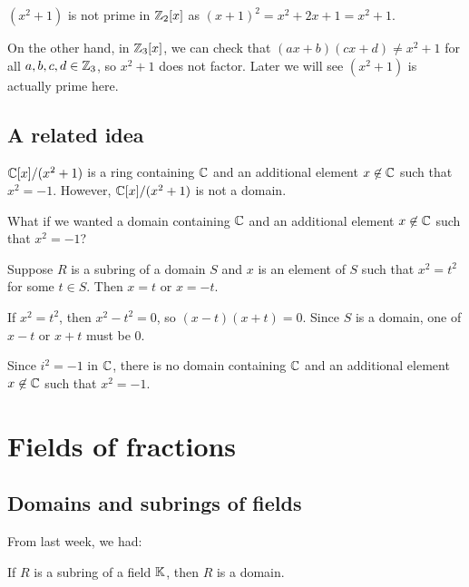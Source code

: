 \documentclass[12pt,letterpaper]{report}
\begin{document}
\begin{ex}
  $(x^2 + 1)$ is not prime in $\mathbb{Z}_2[x]$ as $(x + 1)^2 = x^2 + 2x + 1 = x^2 + 1$.

  On the other hand, in $\mathbb{Z}_3[x]$, we can check that $(ax + b)(cx + d) \neq x^2 + 1$ for all
  $a, b, c, d \in \mathbb{Z}_3$, so $x^2 + 1$ does not factor.
  Later we will see $(x^2 + 1)$ is actually prime here.
\end{ex}

\pagebreak
\subsection{A related idea}

$\mathbb{C}[x]/(x^2 + 1)$ is a ring containing $\mathbb{C}$ and an additional element $x \not\in \mathbb{C}$ such that
$x^2 = -1$.
However, $\mathbb{C}[x]/(x^2 + 1)$ is not a domain.

What if we wanted a domain containing $\mathbb{C}$ and an additional element $x \not\in \mathbb{C}$ such that
$x^2 = -1$?

\begin{prop}{}{}
  Suppose $R$ is a subring of a domain $S$ and $x$ is an element of $S$ such that $x^2 = t^2$ for
  some $t \in S$.
  Then $x = t$ or $x = -t$.
\end{prop}

\begin{thmproof}
  If $x^2 = t^2$, then $x^2 - t^2 = 0$, so $(x - t)(x + t) = 0$.
  Since $S$ is a domain, one of $x - t$ or $x + t$ must be 0.
\end{thmproof}

Since $i^2 = -1$ in $\mathbb{C}$, there is no domain containing $\mathbb{C}$ and an additional element
$x \not\in \mathbb{C}$ such that $x^2 = -1$.


\section{Fields of fractions}

\subsection{Domains and subrings of fields}
From last week, we had:

\begin{prop}{}{}
  If $R$ is a subring of a field $\mathbb{K}$, then $R$ is a domain.
\end{prop}
\end{document}

